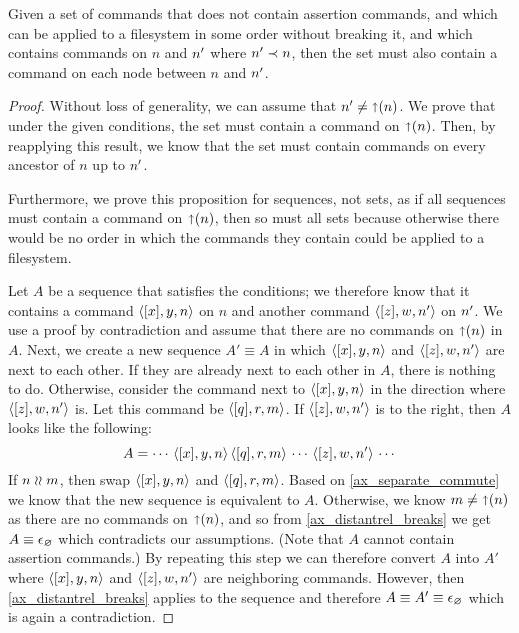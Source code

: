 \begin{mylem}
Given a set of commands that
does not contain assertion commands,
and which can be applied to a filesystem in some order without breaking it,
and which contains commands on $n$ and $n'$ where $n'\prec n$,
then the set must also contain a command
on each node between $n$ and $n'$.
\end{mylem}
\begin{proof}
Without loss of generality, we can assume that $n'\neq\mathord{\shortuparrow}(n)$.
We prove that under the given conditions, the set must contain a command on $\mathord{\shortuparrow}(n)$.
Then, by reapplying this result, we know that the set must contain commands on every
ancestor of $n$ up to $n'$.

Furthermore,
we prove this proposition for sequences, not sets, as if all sequences must contain a command on $\mathord{\shortuparrow}(n)$,
then so must all sets because otherwise there would be no order in which the commands they contain could be
applied to a filesystem.

Let $A$ be a sequence that satisfies the conditions;
we therefore know that it contains a command $\langle{[x],y,n}\rangle$ on $n$
and another command $\langle{[z],w,n'}\rangle$ on $n'$.
We use a proof by contradiction and assume that there are no commands on $\mathord{\shortuparrow}(n)$ in $A$.
Next, we create a new sequence $A'\equiv A$ in which $\langle{[x],y,n}\rangle$ and $\langle{[z],w,n'}\rangle$ are next to each other.
If they are already next to each other in $A$, there is nothing to do.
Otherwise, consider the command next to $\langle{[x],y,n}\rangle$ in the direction where $\langle{[z],w,n'}\rangle$ is.
Let this command be $\langle{[q],r,m}\rangle$.
If $\langle{[z],w,n'}\rangle$ is to the right, then $A$ looks like the following:
\[ A = \cdots\,\langle{[x],y,n}\rangle\,\langle{[q],r,m}\rangle\,\cdots\,\langle{[z],w,n'}\rangle\,\cdots \]
If $n\mathrel{\wr\wr} m$, then swap $\langle{[x],y,n}\rangle$ and $\langle{[q],r,m}\rangle$. Based on \cref{ax_separate_commute} we know that the new
sequence is equivalent to $A$.
Otherwise, we know $m\neq\mathord{\shortuparrow}(n)$ as there are no commands on $\mathord{\shortuparrow}(n)$, and so
from \cref{ax_distantrel_breaks} we get $A\equiv\epsilon_\varnothing$ which contradicts our assumptions.
(Note that $A$ cannot contain assertion commands.)
By repeating this step we can therefore convert $A$ into $A'$ where $\langle{[x],y,n}\rangle$ and $\langle{[z],w,n'}\rangle$ are neighboring commands.
However, then \cref{ax_distantrel_breaks} applies to the sequence and therefore $A\equiv A'\equiv\epsilon_\varnothing$ which
is again a contradiction.
\end{proof}


